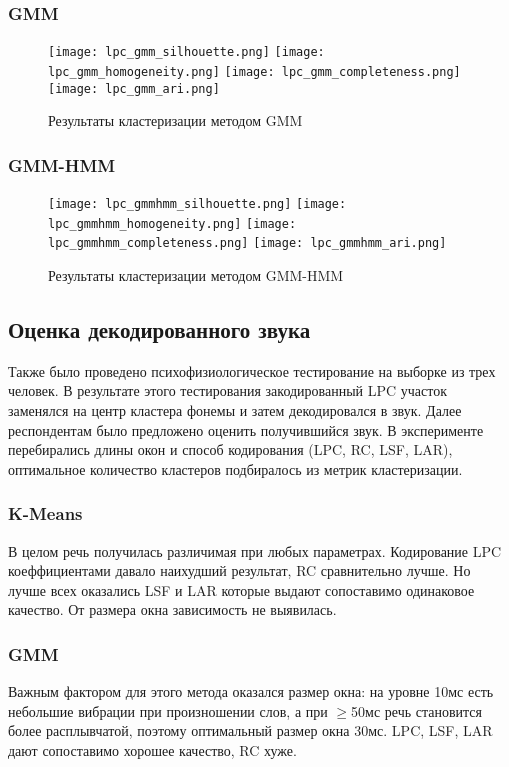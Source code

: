 \documentclass[a4paper,14pt]{extarticle}
\begin{document}
\subsubsection{GMM}
\begin{figure}[H]
	\centering
	\texttt{[image: lpc\_gmm\_silhouette.png]}
	\texttt{[image: lpc\_gmm\_homogeneity.png]}
	\texttt{[image: lpc\_gmm\_completeness.png]}
	\texttt{[image: lpc\_gmm\_ari.png]}
	\caption{Результаты кластеризации методом GMM}
	\label{fig:gmm}
\end{figure}

\subsubsection{GMM-HMM}
\begin{figure}[H]
	\centering
	\texttt{[image: lpc\_gmmhmm\_silhouette.png]}
	\texttt{[image: lpc\_gmmhmm\_homogeneity.png]}
	\texttt{[image: lpc\_gmmhmm\_completeness.png]}
	\texttt{[image: lpc\_gmmhmm\_ari.png]}
	\caption{Результаты кластеризации методом GMM-HMM}
	\label{fig:gmmhmm}
\end{figure}

\subsection{Оценка декодированного звука}
Также было проведено психофизиологическое тестирование на выборке из трех человек. В результате этого тестирования закодированный LPC участок заменялся на центр кластера фонемы и затем декодировался в звук. Далее респондентам было предложено оценить получившийся звук. В эксперименте перебирались длины окон и способ кодирования (LPC, RC, LSF, LAR), оптимальное количество кластеров подбиралось из метрик кластеризации.

\subsubsection{K-Means}
В целом речь получилась различимая при любых параметрах. Кодирование LPC коеффициентами давало наихудший результат, RC сравнительно лучше. Но лучше всех оказались LSF и LAR которые выдают сопоставимо одинаковое качество. От размера окна зависимость не выявилась.

\subsubsection{GMM}
Важным фактором для этого метода оказался размер окна: на уровне 10мс есть небольшие вибрации при произношении слов, а при $\geq$50мс речь становится более расплывчатой, поэтому оптимальный размер окна 30мс. LPC, LSF, LAR дают сопоставимо хорошее качество, RC хуже.
\end{document}

